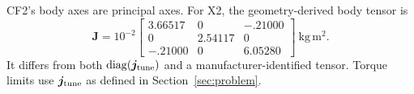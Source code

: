 \documentclass[letterpaper, 10 pt, conference]{ieeeconf}
\begin{document}

CF2's body axes are principal axes. For X2, the geometry-derived body tensor is
\[
 \bm J=10^{-2}\begin{bmatrix}3.66517&0&-.21000\\0&2.54117&0\\-.21000&0&6.05280\end{bmatrix}
 \ \mathrm{kg\,m^2}.
\]
It differs from both $\operatorname{diag}(\bm j_{\rm tune})$ and a
manufacturer-identified tensor. Torque limits use $\bm j_{\rm tune}$ as
defined in Section~\ref{sec:problem}.
\end{document}
